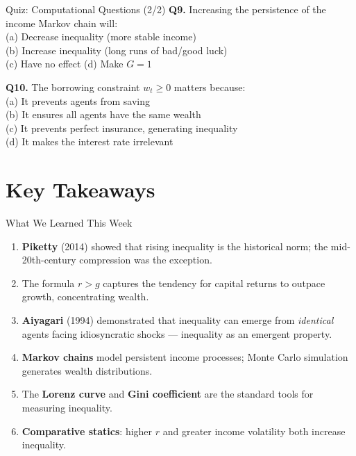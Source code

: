 \documentclass[aspectratio=169, 10pt]{beamer}
\begin{document}
\begin{frame}{Quiz: Computational Questions (2/2)}
\textbf{Q9.} Increasing the persistence of the income Markov chain will: \\[3pt]
\quad (a) Decrease inequality (more stable income) \\
\quad (b) \alert{Increase inequality (long runs of bad/good luck)} \\
\quad (c) Have no effect \quad
(d) Make $G = 1$
\vspace{0.8em}

\textbf{Q10.} The borrowing constraint $w_t \geq 0$ matters because: \\[3pt]
\quad (a) It prevents agents from saving \\
\quad (b) It ensures all agents have the same wealth \\
\quad (c) \alert{It prevents perfect insurance, generating inequality} \\
\quad (d) It makes the interest rate irrelevant
\end{frame}

\section{Key Takeaways}

\begin{frame}{What We Learned This Week}
\begin{enumerate}
  \item \textbf{Piketty} (2014) showed that rising inequality is the
        historical norm; the mid-20th-century compression was the exception.
  \item The formula $r > g$ captures the tendency for capital returns to
        outpace growth, concentrating wealth.
  \item \textbf{Aiyagari} (1994) demonstrated that inequality can emerge
        from \textit{identical} agents facing idiosyncratic shocks ---
        inequality as an \alert{emergent property}.
  \item \textbf{Markov chains} model persistent income processes;
        Monte Carlo simulation generates wealth distributions.
  \item The \textbf{Lorenz curve} and \textbf{Gini coefficient} are
        the standard tools for measuring inequality.
  \item \textbf{Comparative statics}: higher $r$ and greater income
        volatility both increase inequality.
\end{enumerate}
\end{frame}
\end{document}

